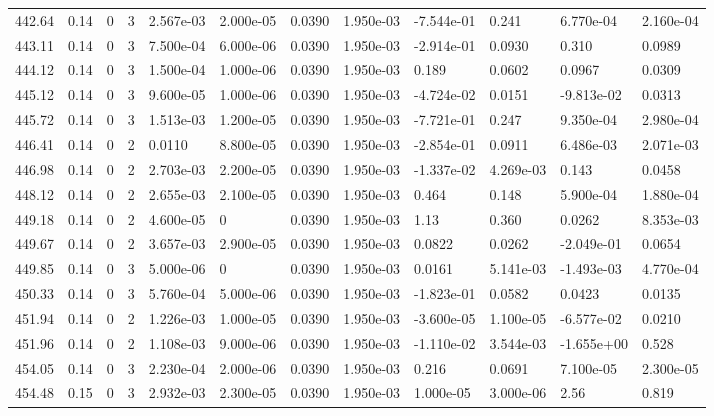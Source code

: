\documentclass[preview]{standalone}
\begin{document}
{{{{{{{{{{{{{{\begin{tabular}{L{1.2cm}C{1.2cm} C{0.3cm}C{0.5cm} C{1.4cm}C{1.4cm} C{1.4cm}C{1.4cm} C{1.6cm}C{1.6cm} C{1.6cm}C{1.6cm}}
  442.64  &  0.14  & 0     &  3 &  2.567e-03  & 2.000e-05  &  0.0390&   1.950e-03& -7.544e-01 & 0.241   &  6.770e-04 & 2.160e-04  \\ 
  443.11  &  0.14  & 0     &  3 &  7.500e-04  & 6.000e-06  &  0.0390&   1.950e-03& -2.914e-01 & 0.0930   &  0.310 & 0.0989  \\ 
  444.12  &  0.14  & 0     &  3 &  1.500e-04  & 1.000e-06  &  0.0390&   1.950e-03& 0.189 & 0.0602   &  0.0967 & 0.0309  \\ 
  445.12  &  0.14  & 0     &  3 &  9.600e-05  & 1.000e-06  &  0.0390&   1.950e-03& -4.724e-02 & 0.0151   &  -9.813e-02 & 0.0313  \\ 
  445.72  &  0.14  & 0     &  3 &  1.513e-03  & 1.200e-05  &  0.0390&   1.950e-03& -7.721e-01 & 0.247   &  9.350e-04 & 2.980e-04  \\ 
  446.41  &  0.14  & 0     &  2 &  0.0110  & 8.800e-05  &  0.0390&   1.950e-03& -2.854e-01 & 0.0911   &  6.486e-03 & 2.071e-03  \\ 
  446.98  &  0.14  & 0     &  2 &  2.703e-03  & 2.200e-05  &  0.0390&   1.950e-03& -1.337e-02 & 4.269e-03   &  0.143 & 0.0458  \\ 
  448.12  &  0.14  & 0     &  2 &  2.655e-03  & 2.100e-05  &  0.0390&   1.950e-03& 0.464 & 0.148   &  5.900e-04 & 1.880e-04  \\ 
  449.18  &  0.14  & 0     &  2 &  4.600e-05  & 0  &  0.0390&   1.950e-03& 1.13 & 0.360   &  0.0262 & 8.353e-03  \\ 
  449.67  &  0.14  & 0     &  2 &  3.657e-03  & 2.900e-05  &  0.0390&   1.950e-03& 0.0822 & 0.0262   &  -2.049e-01 & 0.0654  \\ 
  449.85  &  0.14  & 0     &  3 &  5.000e-06  & 0  &  0.0390&   1.950e-03& 0.0161 & 5.141e-03   &  -1.493e-03 & 4.770e-04  \\ 
  450.33  &  0.14  & 0     &  3 &  5.760e-04  & 5.000e-06  &  0.0390&   1.950e-03& -1.823e-01 & 0.0582   &  0.0423 & 0.0135  \\ 
  451.94  &  0.14  & 0     &  2 &  1.226e-03  & 1.000e-05  &  0.0390&   1.950e-03& -3.600e-05 & 1.100e-05   &  -6.577e-02 & 0.0210  \\ 
  451.96  &  0.14  & 0     &  2 &  1.108e-03  & 9.000e-06  &  0.0390&   1.950e-03& -1.110e-02 & 3.544e-03   &  -1.655e+00 & 0.528  \\ 
  454.05  &  0.14  & 0     &  3 &  2.230e-04  & 2.000e-06  &  0.0390&   1.950e-03& 0.216 & 0.0691   &  7.100e-05 & 2.300e-05  \\ 
  454.48  &  0.15  & 0     &  3 &  2.932e-03  & 2.300e-05  &  0.0390&   1.950e-03& 1.000e-05 & 3.000e-06   &  2.56 & 0.819  \\ 

\end{tabular}}}}}}}}}}}}}}}
\end{document}
